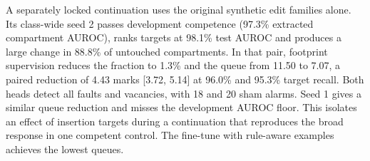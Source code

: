 A separately locked continuation uses the original synthetic edit families alone. Its class-wide seed 2 passes development competence (97.3\% extracted compartment AUROC), ranks targets at 98.1\% test AUROC and produces a large change in 88.8\% of untouched compartments. In that pair, footprint supervision reduces the fraction to 1.3\% and the queue from 11.50 to 7.07, a paired reduction of 4.43 marks [3.72, 5.14] at 96.0\% and 95.3\% target recall. Both heads detect all faults and vacancies, with 18 and 20 sham alarms. Seed 1 gives a similar queue reduction and misses the development AUROC floor. This isolates an effect of insertion targets during a continuation that reproduces the broad response in one competent control. The fine-tune with rule-aware examples achieves the lowest queues.
